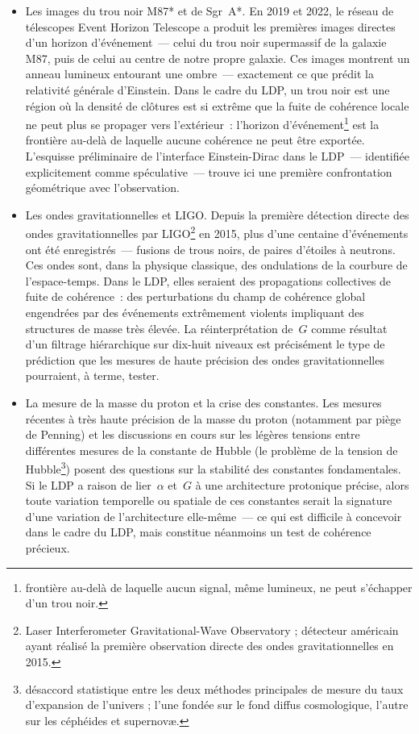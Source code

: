 \documentclass[12pt, a4paper, openright]{book}
\begin{document}
\begin{itemize}

\item Les images du trou noir M87* et de Sgr~A*. En 2019 et 2022, le réseau de télescopes Event Horizon Telescope a produit les premières images directes d'un horizon d'événement~--- celui du trou noir supermassif de la galaxie M87, puis de celui au centre de notre propre galaxie. Ces images montrent un anneau lumineux entourant une ombre~--- exactement ce que prédit la relativité générale d'Einstein. Dans le cadre du LDP, un trou noir est une région où la densité de clôtures est si extrême que la fuite de cohérence locale ne peut plus se propager vers l'extérieur~: l'horizon d'événement\footnote{frontière au-delà de laquelle aucun signal, même lumineux, ne peut s'échapper d'un trou noir.} est la frontière au-delà de laquelle aucune cohérence ne peut être exportée. L'esquisse préliminaire de l'interface Einstein-Dirac dans le LDP~--- identifiée explicitement comme spéculative~--- trouve ici une première confrontation géométrique avec l'observation.

\item Les ondes gravitationnelles et LIGO. Depuis la première détection directe des ondes gravitationnelles par LIGO\footnote{Laser Interferometer Gravitational-Wave Observatory ; détecteur américain ayant réalisé la première observation directe des ondes gravitationnelles en 2015.} en 2015, plus d'une centaine d'événements ont été enregistrés~--- fusions de trous noirs, de paires d'étoiles à neutrons. Ces ondes sont, dans la physique classique, des ondulations de la courbure de l'espace-temps. Dans le LDP, elles seraient des propagations collectives de fuite de cohérence~: des perturbations du champ de cohérence global engendrées par des événements extrêmement violents impliquant des structures de masse très élevée. La réinterprétation de~$G$ comme résultat d'un filtrage hiérarchique sur dix-huit niveaux est précisément le type de prédiction que les mesures de haute précision des ondes gravitationnelles pourraient, à terme, tester.

\item La mesure de la masse du proton et la crise des constantes. Les mesures récentes à très haute précision de la masse du proton (notamment par piège de Penning) et les discussions en cours sur les légères tensions entre différentes mesures de la constante de Hubble (le \og problème de la tension de Hubble\footnote{désaccord statistique entre les deux méthodes principales de mesure du taux d'expansion de l'univers ; l'une fondée sur le fond diffus cosmologique, l'autre sur les céphéides et supernovæ.}\fg{}) posent des questions sur la stabilité des constantes fondamentales. Si le LDP a raison de lier~$\alpha$ et~$G$ à une architecture protonique précise, alors toute variation temporelle ou spatiale de ces constantes serait la signature d'une variation de l'architecture elle-même~--- ce qui est difficile à concevoir dans le cadre du LDP, mais constitue néanmoins un test de cohérence précieux.


\end{itemize}
\end{document}
